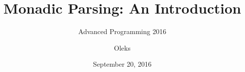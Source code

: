 \documentclass[xcolor=table]{beamer}
\title{Monadic Parsing: An Introduction}
\subtitle{Advanced Programming 2016}
\institute{DIKU}
\author{Oleks}
\date{September 20, 2016}
\begin{document}
\renewcommand*{\arraystretch}{1.2}

\begin{frame} \titlepage \end{frame}





%








































\end{document}

